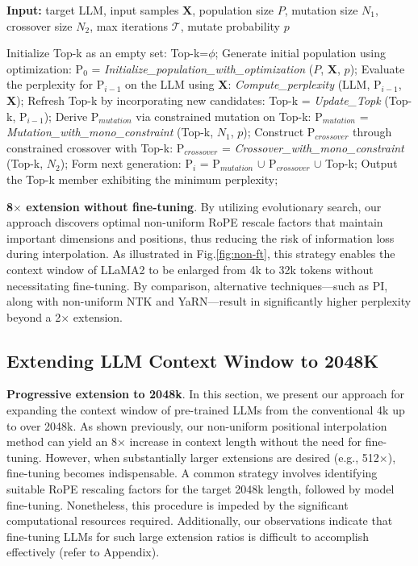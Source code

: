 \begin{algorithm}[t]
	\small
	\caption{The search algorithm}
	\textbf{Input:} target LLM, input samples $\mathbf{X}$,   population size $P$, mutation size $N_1$, crossover size $N_2$, max iterations $\mathcal{T}$, mutate probability $p$\\

	\begin{algorithmic}[1]
		\label{alg:search}
		\STATE Initialize Top-k as an empty set: Top-k=$\phi$;	
		\STATE Generate initial population using optimization: $\text{P}_0$ = \textit{Initialize\_population\_with\_optimization} ($P$, $\mathbf{X}$, $p$);
		\STATE Evaluate the perplexity for $\text{P}_{i-1}$ on the LLM using $\mathbf{X}$: \textit{Compute\_perplexity} (LLM, $\text{P}_{i-1}$, $\mathbf{X}$);
		\STATE Refresh Top-k by incorporating new candidates: Top-k = \textit{Update\_Topk} (Top-k, $\text{P}_{i-1}$);
		\STATE Derive $\text{P}_{mutation}$ via constrained mutation on Top-k: $\text{P}_{mutation}$ = \textit{Mutation\_with\_mono\_constraint} (Top-k, $N_1$, $p$);
		\STATE Construct $\text{P}_{crossover}$ through constrained crossover with Top-k: $\text{P}_{crossover}$ = \textit{Crossover\_with\_mono\_constraint} (Top-k, $N_2$);
		\STATE Form next generation: $\text{P}_i$ = $\text{P}_{mutation}$ $\cup$ $\text{P}_{crossover}$ $\cup$ Top-k;
		\ENDFOR
		\STATE Output the Top-k member exhibiting the minimum perplexity;
	\end{algorithmic}
\end{algorithm}

\textbf{8$\times$ extension without fine-tuning}. By utilizing evolutionary search, our approach discovers optimal non-uniform RoPE rescale factors that maintain important dimensions and positions, thus reducing the risk of information loss during interpolation. As illustrated in Fig.\ref{fig:non-ft}, this strategy enables the context window of LLaMA2 to be enlarged from 4k to 32k tokens without necessitating fine-tuning. By comparison, alternative techniques—such as PI, along with non-uniform NTK and YaRN—result in significantly higher perplexity beyond a 2$\times$ extension.

\subsection{Extending LLM Context Window to 2048K}
\label{sec:extendto2048k}

\textbf{Progressive extension to 2048k}. In this section, we present our approach for expanding the context window of pre-trained LLMs from the conventional 4k up to over 2048k. As shown previously, our non-uniform positional interpolation method can yield an 8$\times$ increase in context length without the need for fine-tuning. However, when substantially larger extensions are desired (e.g., 512$\times$), fine-tuning becomes indispensable. A common strategy involves identifying suitable RoPE rescaling factors for the target 2048k length, followed by model fine-tuning. Nonetheless, this procedure is impeded by the significant computational resources required. Additionally, our observations indicate that fine-tuning LLMs for such large extension ratios is difficult to accomplish effectively (refer to Appendix).


